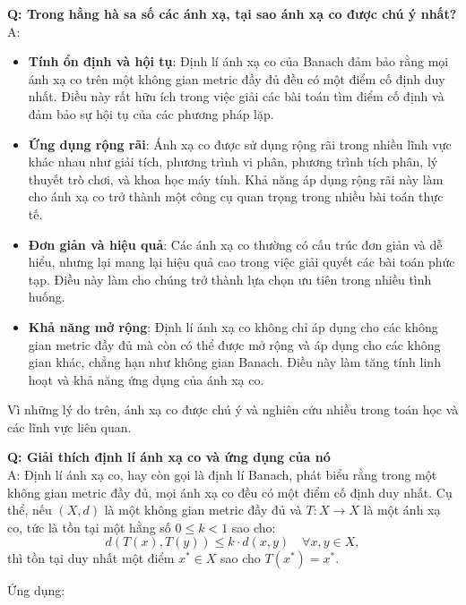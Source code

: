 \textbf{Q: Trong hằng hà sa số các ánh xạ, tại sao ánh xạ co được chú ý nhất?}\\
A: 
\begin{itemize}
    \item \textbf{Tính ổn định và hội tụ}: Định lí ánh xạ co của Banach đảm bảo rằng mọi ánh xạ co trên một không gian metric đầy đủ đều có một điểm cố định duy nhất. Điều này rất hữu ích trong việc giải các bài toán tìm điểm cố định và đảm bảo sự hội tụ của các phương pháp lặp.
    
    \item \textbf{Ứng dụng rộng rãi}: Ánh xạ co được sử dụng rộng rãi trong nhiều lĩnh vực khác nhau như giải tích, phương trình vi phân, phương trình tích phân, lý thuyết trò chơi, và khoa học máy tính. Khả năng áp dụng rộng rãi này làm cho ánh xạ co trở thành một công cụ quan trọng trong nhiều bài toán thực tế.
    
    \item \textbf{Đơn giản và hiệu quả}: Các ánh xạ co thường có cấu trúc đơn giản và dễ hiểu, nhưng lại mang lại hiệu quả cao trong việc giải quyết các bài toán phức tạp. Điều này làm cho chúng trở thành lựa chọn ưu tiên trong nhiều tình huống.
    
    \item \textbf{Khả năng mở rộng}: Định lí ánh xạ co không chỉ áp dụng cho các không gian metric đầy đủ mà còn có thể được mở rộng và áp dụng cho các không gian khác, chẳng hạn như không gian Banach. Điều này làm tăng tính linh hoạt và khả năng ứng dụng của ánh xạ co.
\end{itemize}

Vì những lý do trên, ánh xạ co được chú ý và nghiên cứu nhiều trong toán học và các lĩnh vực liên quan.

\textbf{Q: Giải thích định lí ánh xạ co và ứng dụng của nó}\\
A: Định lí ánh xạ co, hay còn gọi là định lí Banach, phát biểu rằng trong một không gian metric đầy đủ, mọi ánh xạ co đều có một điểm cố định duy nhất. Cụ thể, nếu $(X, d)$ là một không gian metric đầy đủ và $T: X \to X$ là một ánh xạ co, tức là tồn tại một hằng số $0 \leq k < 1$ sao cho:
\[
d(T(x), T(y)) \leq k \cdot d(x, y) \quad \forall x, y \in X,
\]
thì tồn tại duy nhất một điểm $x^* \in X$ sao cho $T(x^*) = x^*$.

Ứng dụng:

